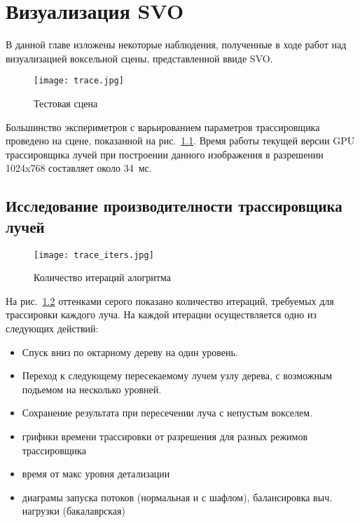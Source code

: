 \chapter{Визуализация SVO}

В данной главе изложены некоторые наблюдения, полученные в ходе работ над визуализацией воксельной сцены, представленной ввиде SVO.

\begin{figure}[ht]
\center
\texttt{[image: trace.jpg]}
\caption{Тестовая сцена}
\label{fig:trace}
\end{figure}

Большинство экспериметров с варьированием параметров трассировщика проведено на сцене, показанной на рис.~\ref{fig:trace}. Время работы текущей версии GPU трассировщика лучей при построении данного изображения в разрешении 1024x768 составляет около 34~мс. 

\section{Исследование производителности трассировщика лучей}

\begin{figure}[ht]
\center
\texttt{[image: trace\_iters.jpg]}
\caption{Количество итераций алогритма }
\label{fig:trace_iters}
\end{figure}

На рис.~\ref{fig:trace_iters} оттенками серого показано количество итераций, требуемых для трассировки каждого луча. На каждой итерации осуществляется одно из следующих действий:

\begin{itemize}
  \item Спуск вниз по октарному дереву на один уровень.
  \item Переход к следующему пересекаемому лучем узлу дерева, с возможным подьемом на несколько уровней.
  \item Сохранение результата при пересечении луча с непустым вокселем.
\end{itemize}

\begin{itemize}
  \item грифики времени трассировки от разрешения для разных режимов трассировщика
  \item время от макс уровня детализации
  \item диаграмы запуска потоков (нормальная и с шафлом), балансировка выч. нагрузки (бакалаврская)
\end{itemize}


